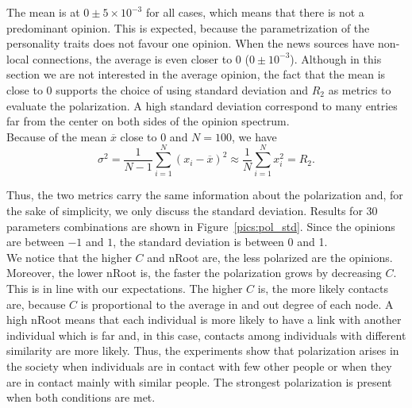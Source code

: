 The mean is at  $0 \pm 5\times 10^{-3}$ for all cases, which means that there is not a predominant opinion. This is expected, because the parametrization of the personality traits does not favour one opinion. When the news sources have non-local connections, the average is even closer to 0 ($0 \pm 10^{-3}$). Although in this section we are not interested in the average opinion, the fact that the mean is close to 0 supports the choice of using standard deviation and $R_2$ as metrics to evaluate the polarization. A high standard deviation correspond to many entries far from the center on both sides of the opinion spectrum.\\

Because of the mean $\overline{x}$ close to 0 and $N=100$, we have
$$ \sigma^2 = \frac{1}{N-1} \sum_{i=1}^N (x_i-\overline{x})^2 \approx \frac{1}{N} \sum_{i=1}^N x_i^2 = R_2.$$

Thus, the two metrics carry the same information about the polarization and, for the sake of simplicity, we only discuss the standard deviation. Results for 30 parameters combinations are shown in Figure~\ref{pics:pol_std}. Since the opinions are between $-1$ and $1$, the standard deviation is between 0 and 1.\\

We notice that the higher $C$ and nRoot are, the less polarized are the opinions. Moreover, the lower nRoot is, the faster the polarization grows by decreasing $C$. This is in line with our expectations. The higher $C$ is, the more likely contacts are, because $C$ is proportional to the average in and out degree of each node. A high nRoot means that each individual is more likely to have a link with another individual which is far and, in this case, contacts among individuals with different similarity are more likely. Thus, the experiments show that polarization arises in the society when individuals are in contact with few other people or when they are in contact mainly with similar people. The strongest polarization is present when both conditions are met.\\


